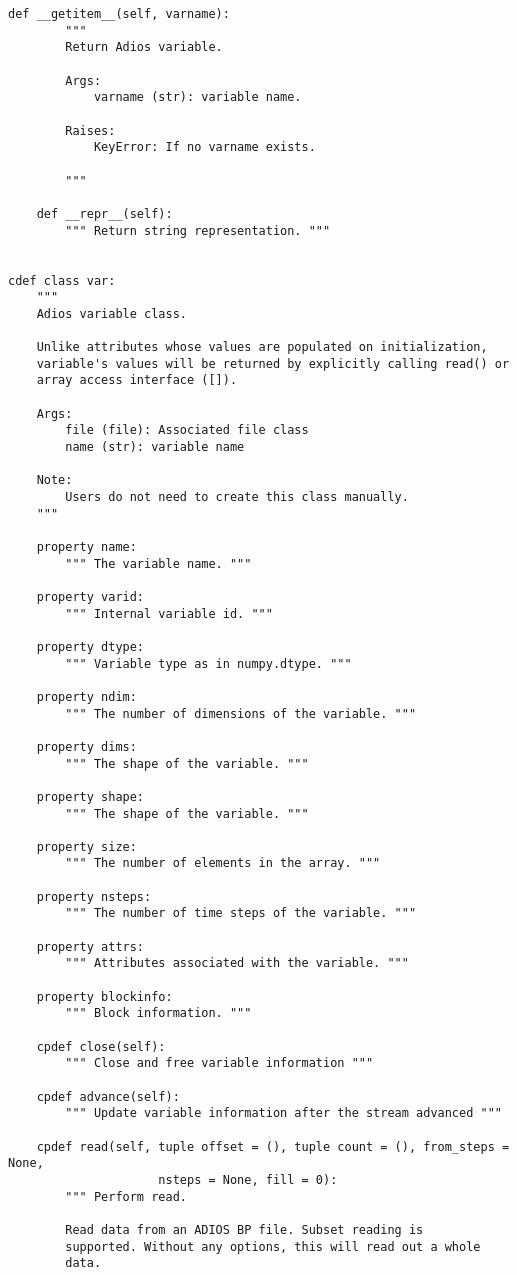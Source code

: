 \begin{lstlisting}[language=cython,caption={Read functions},label={},]
    def __getitem__(self, varname):
        """
        Return Adios variable.

        Args:
            varname (str): variable name.

        Raises:
            KeyError: If no varname exists.

        """
        
    def __repr__(self):
        """ Return string representation. """


cdef class var:
    """
    Adios variable class.

    Unlike attributes whose values are populated on initialization,
    variable's values will be returned by explicitly calling read() or
    array access interface ([]).  

    Args:
        file (file): Associated file class
        name (str): variable name

    Note:
        Users do not need to create this class manually.
    """
    
    property name:
        """ The variable name. """
    
    property varid:
        """ Internal variable id. """
    
    property dtype:
        """ Variable type as in numpy.dtype. """

    property ndim:
        """ The number of dimensions of the variable. """

    property dims:
        """ The shape of the variable. """

    property shape:
        """ The shape of the variable. """

    property size:
        """ The number of elements in the array. """

    property nsteps:
        """ The number of time steps of the variable. """

    property attrs:
        """ Attributes associated with the variable. """

    property blockinfo:
        """ Block information. """

    cpdef close(self):
        """ Close and free variable information """

    cpdef advance(self):
        """ Update variable information after the stream advanced """

    cpdef read(self, tuple offset = (), tuple count = (), from_steps = None, 
                     nsteps = None, fill = 0):
        """ Perform read.

        Read data from an ADIOS BP file. Subset reading is
        supported. Without any options, this will read out a whole
        data.


\end{lstlisting}
